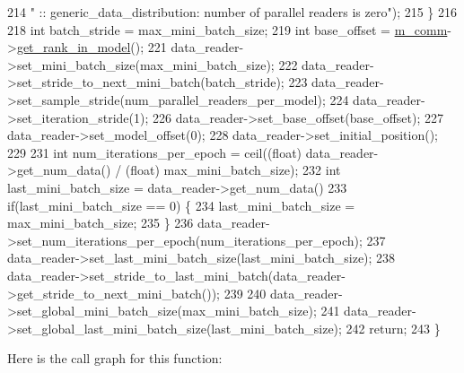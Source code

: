 \begin{DoxyCode}
214       \textcolor{stringliteral}{" :: generic\_data\_distribution: number of parallel readers is zero"});
215   \}
216 
218   \textcolor{keywordtype}{int} batch\_stride = max\_mini\_batch\_size;
219   \textcolor{keywordtype}{int} base\_offset  = \hyperlink{classlbann_1_1generic__io__buffer_a2e4a46c85c8b30e10b1cc5acaa2c4cca}{m\_comm}->\hyperlink{classlbann_1_1lbann__comm_a789453454468a3b70de768537c50ca52}{get\_rank\_in\_model}();
221   data\_reader->set\_mini\_batch\_size(max\_mini\_batch\_size);
222   data\_reader->set\_stride\_to\_next\_mini\_batch(batch\_stride);
223   data\_reader->set\_sample\_stride(num\_parallel\_readers\_per\_model);
224   data\_reader->set\_iteration\_stride(1);
226   data\_reader->set\_base\_offset(base\_offset);
227   data\_reader->set\_model\_offset(0);
228   data\_reader->set\_initial\_position();
229 
231   \textcolor{keywordtype}{int} num\_iterations\_per\_epoch = ceil((\textcolor{keywordtype}{float}) data\_reader->get\_num\_data() / (float) max\_mini\_batch\_size);
232   \textcolor{keywordtype}{int} last\_mini\_batch\_size = data\_reader->get\_num\_data() %
233   \textcolor{keywordflow}{if}(last\_mini\_batch\_size == 0) \{
234     last\_mini\_batch\_size = max\_mini\_batch\_size;
235   \}
236   data\_reader->set\_num\_iterations\_per\_epoch(num\_iterations\_per\_epoch);
237   data\_reader->set\_last\_mini\_batch\_size(last\_mini\_batch\_size);
238   data\_reader->set\_stride\_to\_last\_mini\_batch(data\_reader->get\_stride\_to\_next\_mini\_batch());
239 
240   data\_reader->set\_global\_mini\_batch\_size(max\_mini\_batch\_size);
241   data\_reader->set\_global\_last\_mini\_batch\_size(last\_mini\_batch\_size);
242   \textcolor{keywordflow}{return};
243 \}
\end{DoxyCode}
Here is the call graph for this function\+:\nopagebreak

